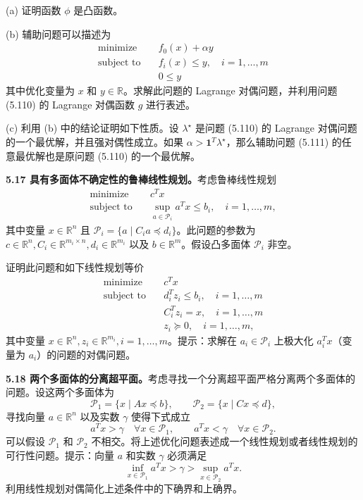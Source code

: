\documentclass[UTF8, 12pt, fontset=fandol, oneside]{ctexart}
\begin{document}
(a) 证明函数 $\phi$ 是凸函数。

(b) 辅助问题可以描述为
\[
\begin{aligned}
\text{minimize}\quad & f_0(x)+\alpha y\\
\text{subject to}\quad & f_i(x)\leq y,\quad i=1,\ldots,m\\
& 0\leq y
\end{aligned}
\]
其中优化变量为 $x$ 和 $y\in\mathbb{R}$。求解此问题的 Lagrange 对偶问题，并利用问题 (5.110) 的 Lagrange 对偶函数 $g$ 进行表述。

(c) 利用 (b) 中的结论证明如下性质。设 $\lambda^\star$ 是问题 (5.110) 的 Lagrange 对偶问题的一个最优解，并且强对偶性成立。如果 $\alpha>\mathbf{1}^T\lambda^\star$，那么辅助问题 (5.111) 的任意最优解也是原问题 (5.110) 的一个最优解。

\noindent\textbf{5.17 具有多面体不确定性的鲁棒线性规划。}\quad 考虑鲁棒线性规划
\[
\begin{aligned}
\text{minimize}\quad & c^Tx\\
\text{subject to}\quad & \sup_{a\in\mathcal{P}_i}a^Tx\leq b_i,\quad i=1,\ldots,m,
\end{aligned}
\]
其中变量 $x\in\mathbb{R}^n$ 且 $\mathcal{P}_i=\{a\mid C_ia\preceq d_i\}$。此问题的参数为 $c\in\mathbb{R}^n, C_i\in\mathbb{R}^{m_i\times n}, d_i\in\mathbb{R}^{m_i}$ 以及 $b\in\mathbb{R}^m$。假设凸多面体 $\mathcal{P}_i$ 非空。

证明此问题和如下线性规划等价
\[
\begin{aligned}
\text{minimize}\quad & c^Tx\\
\text{subject to}\quad & d_i^Tz_i\leq b_i,\quad i=1,\ldots,m\\
& C_i^Tz_i=x,\quad i=1,\ldots,m\\
& z_i\succeq 0,\quad i=1,\ldots,m,
\end{aligned}
\]
其中变量 $x\in\mathbb{R}^n, z_i\in\mathbb{R}^{m_i}, i=1,\ldots,m$。提示：求解在 $a_i\in\mathcal{P}_i$ 上极大化 $a_i^Tx$（变量为 $a_i$）的问题的对偶问题。

\noindent\textbf{5.18 两个多面体的分离超平面。}\quad 考虑寻找一个分离超平面严格分离两个多面体的问题。设这两个多面体为
\[
\mathcal{P}_1=\{x\mid Ax\preceq b\},\qquad \mathcal{P}_2=\{x\mid Cx\preceq d\},
\]
寻找向量 $a\in\mathbb{R}^n$ 以及实数 $\gamma$ 使得下式成立
\[
a^Tx>\gamma\quad \forall x\in\mathcal{P}_1,\qquad a^Tx<\gamma\quad \forall x\in\mathcal{P}_2.
\]
可以假设 $\mathcal{P}_1$ 和 $\mathcal{P}_2$ 不相交。将上述优化问题表述成一个线性规划或者线性规划的可行性问题。提示：向量 $a$ 和实数 $\gamma$ 必须满足
\[
\inf_{x\in\mathcal{P}_1}a^Tx>\gamma>\sup_{x\in\mathcal{P}_2}a^Tx.
\]
利用线性规划对偶简化上述条件中的下确界和上确界。
\end{document}
